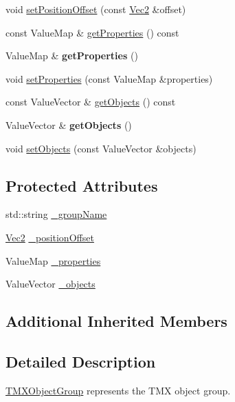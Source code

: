\begin{DoxyCompactItemize}
\item 
void \hyperlink{classTMXObjectGroup_a0280a11095c886a5e3f195f40377dd20}{set\+Position\+Offset} (const \hyperlink{classVec2}{Vec2} \&offset)
\item 
const Value\+Map \& \hyperlink{classTMXObjectGroup_a182c7a7b7ed113bf2c974fcfff818d28}{get\+Properties} () const
\item 
\mbox{\label{classTMXObjectGroup_a6ffcb9e173bcad84d14e784515525347}} 
Value\+Map \& {\bfseries get\+Properties} ()
\item 
void \hyperlink{classTMXObjectGroup_aefd094cfbf8755171cfc69689910b1de}{set\+Properties} (const Value\+Map \&properties)
\item 
const Value\+Vector \& \hyperlink{classTMXObjectGroup_a643c72fe79aabd06d076597a7f8aeefd}{get\+Objects} () const
\item 
\mbox{\label{classTMXObjectGroup_a82da93c74949ad4ea084e04700ebe050}} 
Value\+Vector \& {\bfseries get\+Objects} ()
\item 
void \hyperlink{classTMXObjectGroup_afa4934557f0adc40d0e8e5c8d269bf5f}{set\+Objects} (const Value\+Vector \&objects)
\end{DoxyCompactItemize}
\subsection*{Protected Attributes}
\begin{DoxyCompactItemize}
\item 
std\+::string \hyperlink{classTMXObjectGroup_a04e557d994f1cdb9de741dd4567e7419}{\+\_\+group\+Name}
\item 
\hyperlink{classVec2}{Vec2} \hyperlink{classTMXObjectGroup_ae48c8e2c3fe4152c276855f432a50b50}{\+\_\+position\+Offset}
\item 
Value\+Map \hyperlink{classTMXObjectGroup_ad830297e4e24c6c885980a18f06695e1}{\+\_\+properties}
\item 
Value\+Vector \hyperlink{classTMXObjectGroup_a4a69a9fd73bfc9d7a75fdfb937fd9be1}{\+\_\+objects}
\end{DoxyCompactItemize}
\subsection*{Additional Inherited Members}


\subsection{Detailed Description}
\hyperlink{classTMXObjectGroup}{T\+M\+X\+Object\+Group} represents the T\+MX object group. 

